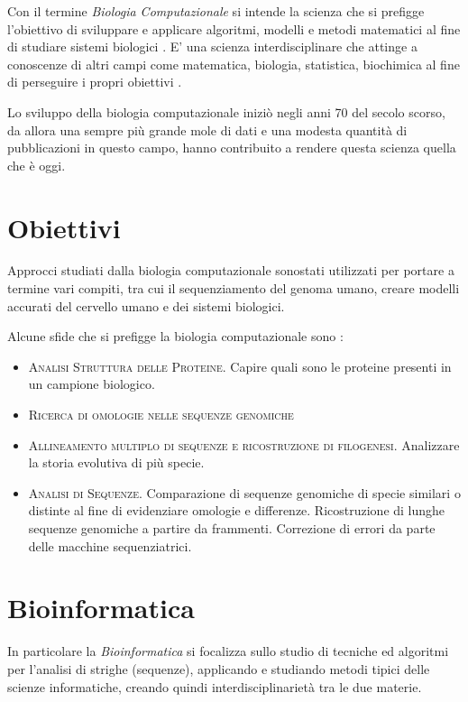 Con il termine \textit{Biologia Computazionale} si intende la scienza che si prefigge l'obiettivo di sviluppare e applicare algoritmi, modelli e metodi matematici al fine di studiare sistemi biologici \cite{Searls19983}. E' una scienza interdisciplinare che attinge a conoscenze di altri campi come matematica, biologia, statistica, biochimica al fine di perseguire i propri obiettivi \cite{AbouttheCCMB}.

Lo sviluppo della biologia computazionale iniziò negli anni 70 del secolo scorso, da allora una sempre più grande mole di dati e una modesta quantità di pubblicazioni in questo campo, hanno contribuito a rendere questa scienza quella che è oggi.

\section{Obiettivi}
Approcci studiati dalla biologia computazionale sonostati utilizzati per portare a termine vari compiti, tra cui il sequenziamento del genoma umano, creare modelli accurati del cervello umano e dei sistemi biologici.

Alcune sfide che si prefigge la biologia computazionale sono \cite{Searls19983}: 

\begin{itemize}
    \item \textsc{Analisi Struttura delle Proteine.} Capire quali sono le proteine presenti in un campione biologico.
    \item \textsc{Ricerca di omologie nelle sequenze genomiche}
    \item \textsc{Allineamento multiplo di sequenze e ricostruzione di filogenesi.} Analizzare la storia evolutiva di più specie.
    \item \textsc{Analisi di Sequenze.} Comparazione di sequenze genomiche di specie similari o distinte al fine di evidenziare omologie e differenze. Ricostruzione di lunghe sequenze genomiche a partire da frammenti. Correzione di errori da parte delle macchine sequenziatrici. 
\end{itemize}

\section{Bioinformatica}
In particolare la \textit{Bioinformatica} si focalizza sullo studio di tecniche ed algoritmi per l'analisi di strighe (sequenze), applicando e studiando metodi tipici delle scienze informatiche, creando quindi interdisciplinarietà tra le due materie.


